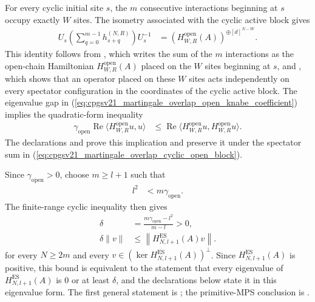 \documentclass{article}
\begin{document}
For every cyclic initial site $s$, the $m$ consecutive interactions beginning
at $s$ occupy exactly $W$ sites.  The isometry associated with the cyclic
active block gives
\begin{align}
    U_s\left(\sum_{q=0}^{m-1}h_{s+q}^{(N,R)}\right)U_s^{-1}
     & =\left(H^{\mathrm{open}}_{W,R}(A)\right)^{\oplus[d]^{N-W}}.
    \label{eq:cpgsv21_martingale_overlap_cyclic_open_block}
\end{align}
This identity follows from
,
which writes the sum of the $m$ interactions as the open-chain Hamiltonian
$H^{\mathrm{open}}_{W,R}(A)$ placed on the $W$ sites beginning at $s$, and
,
which shows that an operator placed on these $W$ sites acts independently on
every spectator configuration in the coordinates of the cyclic active block.
The eigenvalue gap in
(\ref{eq:cpgsv21_martingale_overlap_open_knabe_coefficient}) implies the
quadratic-form inequality
\begin{align}
    \gamma_{\mathrm{open}}
    \operatorname{Re}\langle H^{\mathrm{open}}_{W,R}u,u\rangle
     & \leq
    \operatorname{Re}\langle H^{\mathrm{open}}_{W,R}u,
    H^{\mathrm{open}}_{W,R}u\rangle.
    \label{eq:cpgsv21_martingale_overlap_open_knabe_quadratic}
\end{align}
The declarations
 and
prove this implication and preserve it under the spectator sum in
(\ref{eq:cpgsv21_martingale_overlap_cyclic_open_block}).

Since $\gamma_{\mathrm{open}}>0$, choose $m\geq l+1$ such that
\begin{align}
    l^2
     & <m\gamma_{\mathrm{open}}.
    \label{eq:cpgsv21_martingale_overlap_open_knabe_positive_numerator}
\end{align}
The finite-range cyclic inequality then gives
\begin{align}
    \delta
     & =\frac{m\gamma_{\mathrm{open}}-l^2}{m-l}>0,
    \label{eq:cpgsv21_martingale_overlap_open_knabe_delta}      \\
    \delta\lVert v\rVert
     & \leq\left\lVert H_{N,l+1}^{\mathrm{ES}}(A)v\right\rVert.
    \label{eq:cpgsv21_martingale_overlap_open_knabe_periodic_gap}
\end{align}
for every $N\geq2m$ and every
$v\in(\ker H_{N,l+1}^{\mathrm{ES}}(A))^\perp$.  Since $H_{N,l+1}^{\mathrm{ES}}(A)$
is positive, this bound is equivalent to the statement that every eigenvalue
of $H_{N,l+1}^{\mathrm{ES}}(A)$ is $0$ or at least $\delta$, and the
declarations below state it in this eigenvalue form.  The first general
statement is
; the
primitive-MPS conclusion is
.
\end{document}
